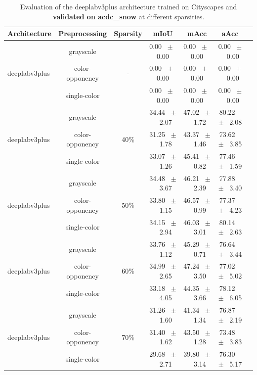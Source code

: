 \begin{table}[h]
  \centering
  \caption{Evaluation of the deeplabv3plus architecture trained on Cityscapes and \textbf{validated on acdc_snow} at different sparsities.}
  \begin{tabular}{@{}lccc ccc@{}}
    \toprule
    Architecture & Preprocessing & Sparsity & mIoU & mAcc & aAcc \\
    \midrule
    \midrule
    \midrule
    \multirow{3}{*}{deeplabv3plus} & grayscale & \multirow{3}{*}{-} & 0.00 ~$\pm$~ 0.00 & 0.00 ~$\pm$~ 0.00 & 0.00 ~$\pm$~ 0.00 \\
    & color-opponency & & 0.00 ~$\pm$~ 0.00 & 0.00 ~$\pm$~ 0.00 & 0.00 ~$\pm$~ 0.00 \\
    & single-color & & 0.00 ~$\pm$~ 0.00 & 0.00 ~$\pm$~ 0.00 & 0.00 ~$\pm$~ 0.00 \\
    \midrule
    \multirow{3}{*}{deeplabv3plus} & grayscale & \multirow{3}{*}{40\%} & 34.44 ~$\pm$~ 2.07 & 47.02 ~$\pm$~ 1.72 & 80.22 ~$\pm$~ 2.08 \\
    & color-opponency & & 31.25 ~$\pm$~ 1.78 & 43.37 ~$\pm$~ 1.46 & 73.62 ~$\pm$~ 3.85 \\
    & single-color & & 33.07 ~$\pm$~ 1.26 & 45.41 ~$\pm$~ 0.82 & 77.46 ~$\pm$~ 1.59 \\
    \midrule
    \multirow{3}{*}{deeplabv3plus} & grayscale & \multirow{3}{*}{50\%} & 34.48 ~$\pm$~ 3.67 & 46.21 ~$\pm$~ 2.39 & 77.88 ~$\pm$~ 3.40 \\
    & color-opponency & & 33.80 ~$\pm$~ 1.15 & 46.57 ~$\pm$~ 0.99 & 77.37 ~$\pm$~ 4.23 \\
    & single-color & & 34.15 ~$\pm$~ 2.94 & 46.03 ~$\pm$~ 3.01 & 80.14 ~$\pm$~ 2.63 \\
    \midrule
    \multirow{3}{*}{deeplabv3plus} & grayscale & \multirow{3}{*}{60\%} & 33.76 ~$\pm$~ 1.12 & 45.29 ~$\pm$~ 0.71 & 76.64 ~$\pm$~ 3.44 \\
    & color-opponency & & 34.99 ~$\pm$~ 2.65 & 47.24 ~$\pm$~ 3.50 & 77.02 ~$\pm$~ 5.02 \\
    & single-color & & 33.18 ~$\pm$~ 4.05 & 44.35 ~$\pm$~ 3.66 & 78.12 ~$\pm$~ 6.05 \\
    \midrule
    \multirow{3}{*}{deeplabv3plus} & grayscale & \multirow{3}{*}{70\%} & 31.26 ~$\pm$~ 1.60 & 41.34 ~$\pm$~ 1.34 & 76.87 ~$\pm$~ 2.19 \\
    & color-opponency & & 31.40 ~$\pm$~ 1.62 & 43.50 ~$\pm$~ 1.28 & 73.48 ~$\pm$~ 3.83 \\
    & single-color & & 29.68 ~$\pm$~ 2.71 & 39.80 ~$\pm$~ 3.14 & 76.30 ~$\pm$~ 5.17 \\

\end{tabular}
\end{table}
